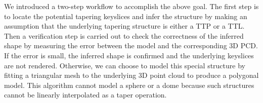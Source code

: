 \documentclass[10pt,twocolumn,letterpaper]{article}
\newcommand{\Sec}[1]{Sec.~\ref{sec:#1}}
\begin{document}
We introduced a two-step workflow to accomplish the above goal.
The first step is to locate the potential tapering keyslices
and infer the structure by making an assumption that 
the underlying tapering structure is either a TTP or a TTL.
Then a verification step is carried out to check the correctness 
of the inferred shape by measuring the error between the model and
the corresponding 3D PCD.
If the error is small, the inferred shape is confirmed
and the underlying keyslices are not rendered.
Otherwise, we can choose to model this special structure by fitting a
triangular mesh to the underlying 3D point cloud to produce a polygonal model.
This algorithm cannot model a sphere or a dome because such structures
cannot be linearly interpolated as a taper operation.

% 
% 
\end{document}
